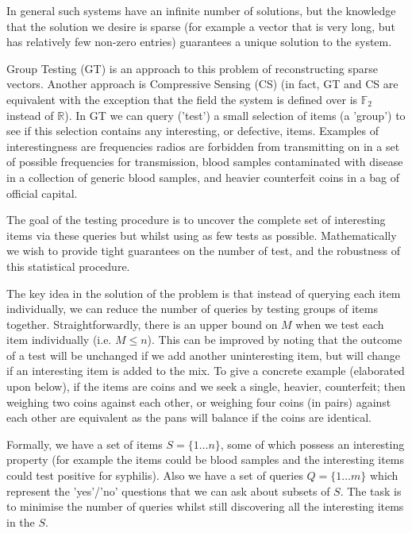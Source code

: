 \documentclass[11pt]{article}
\begin{document}
In general such systems have an infinite number of solutions, but the knowledge that the solution we desire is sparse (for example a vector that is very long, but has relatively few non-zero entries) guarantees a unique solution to the system. 

Group Testing (GT) is an approach to this problem of reconstructing sparse vectors. Another approach is Compressive Sensing (CS) (in fact, GT and CS are equivalent with the exception that the field the system is defined over is \(\mathbb{F}_2\) instead of \(\mathbb{R}\)). In GT we can query ('test') a small selection of items (a 'group') to see if this selection contains any interesting, or defective, items. Examples of interestingness are frequencies radios are forbidden from transmitting on in a set of possible frequencies for transmission, blood samples contaminated with disease in a collection of generic blood samples, and heavier counterfeit coins in a bag of official capital. 

The goal of the testing procedure is to uncover the complete set of interesting items via these queries but whilst using as few tests as possible. Mathematically we wish to provide tight guarantees on the number of test, and the robustness of this statistical procedure.

The key idea in the solution of the problem is that instead of querying each item individually, we can reduce the number of queries by testing groups of items together. Straightforwardly, there is an upper bound on \(M\) when we test each item individually (i.e. \(M \leq n\)). This can be improved by noting that the outcome of a test will be unchanged if we add another uninteresting item, but will change if an interesting item is added to the mix. To give a concrete example (elaborated upon below), if the items are coins and we seek a single, heavier, counterfeit; then weighing two coins against each other, or weighing four coins (in pairs) against each other are equivalent as the pans will balance if the coins are identical.

Formally, we have a set of items \(S = \{1\ldots n\}\), some of which possess an interesting property (for example the items could be blood samples and the interesting items could test positive for syphilis). Also we have a set of queries \(Q = \{1\ldots m\}\) which represent the 'yes'/'no' questions that we can ask about subsets of \(S\). The task is to minimise the number of queries whilst still discovering all the interesting items in the \(S\). 
\end{document}
